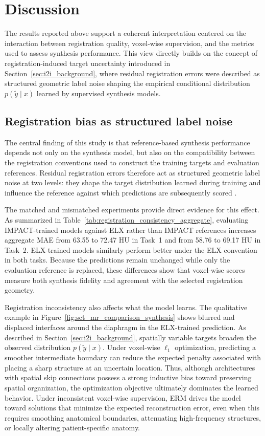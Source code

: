 \documentclass[lettersize,journal]{IEEEtran}
\begin{document}
\section{Discussion} \label{sec:discussion_bias}

The results reported above support a coherent interpretation centered on the interaction between registration quality, voxel-wise supervision, and the metrics used to assess synthesis performance. 
This view directly builds on the concept of registration-induced target uncertainty introduced in Section~\ref{sec:i2i_background}, where residual registration errors were described as structured geometric label noise shaping the empirical conditional distribution $p(\tilde{y}\mid x)$ learned by supervised synthesis models.

\subsection{Registration bias as structured label noise}

The central finding of this study is that reference-based synthesis performance depends not only on the synthesis model, but also on the compatibility between the registration conventions used to construct the training targets and evaluation references. Residual registration errors therefore act as structured geometric label noise at two levels: they shape the target distribution learned during training and influence the reference against which predictions are subsequently scored \cite{dohmen2024similarity}.

The matched and mismatched experiments provide direct evidence for this effect. As summarized in Table~\ref{tab:registration_consistency_aggregate}, evaluating IMPACT-trained models against ELX rather than IMPACT references increases aggregate MAE from 63.55 to 72.47 HU in Task~1 and from 58.76 to 69.17 HU in Task~2. ELX-trained models similarly perform better under the ELX convention in both tasks. Because the predictions remain unchanged while only the evaluation reference is replaced, these differences show that voxel-wise scores measure both synthesis fidelity and agreement with the selected registration geometry.

Registration inconsistency also affects what the model learns. The qualitative example in Figure~\ref{fig:sct_mr_comparison_synthesis} shows blurred and displaced interfaces around the diaphragm in the
ELX-trained prediction. As described in Section~\ref{sec:i2i_background}, spatially variable targets broaden
the observed distribution $p(\tilde{y}\mid x)$. Under voxel-wise $\ell_1$ optimization, predicting a smoother intermediate boundary can reduce the expected penalty associated with placing a sharp structure at an uncertain location. Thus, although architectures with spatial skip connections possess a strong inductive bias toward preserving spatial organization, the optimization objective ultimately dominates the learned behavior. Under inconsistent voxel-wise supervision, ERM drives the model toward solutions that minimize the expected reconstruction error, even when this requires smoothing anatomical boundaries, attenuating high-frequency structures, or locally altering patient-specific anatomy.
\end{document}
